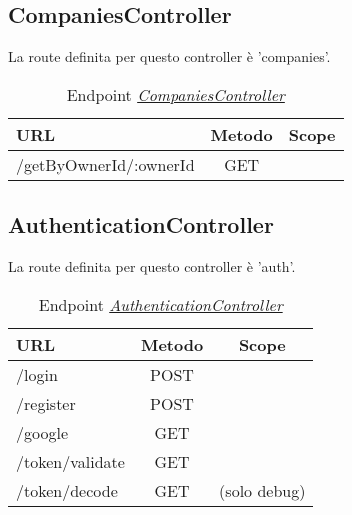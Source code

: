\subsection{CompaniesController}

La route definita per questo controller è 'companies'.

\label{server:companies-controller}
\begin{table}[H]
	\ttfamily
	\caption{Endpoint \hyperref[server:companies-controller]{\textit{CompaniesController}}}
	\centering
	\label{table:api:companies-controller}
	\begin{tabular}{l c c}    
		URL  & Metodo & Scope \\ 
		\midrule
		/getByOwnerId/:ownerId & GET    \\
		\bottomrule
	\end{tabular}
\end{table}

\subsection{AuthenticationController}
La route definita per questo controller è 'auth'.

\label{server:auth-controller}
\begin{table}[H]
	\ttfamily
	\caption{Endpoint \hyperref[server:auth-controller]{\textit{AuthenticationController}}}
	\centering
	\label{table:api:auth-controller}
	\begin{tabular}{l c c}    
		URL  & Metodo & Scope \\ 
		\midrule
		/login & POST &  \\
		/register & POST &  \\
		/google & GET &  \\
		/token/validate & GET  &  \\
		/token/decode & GET  & (solo debug)  \\
		\bottomrule
	\end{tabular}
\end{table}
